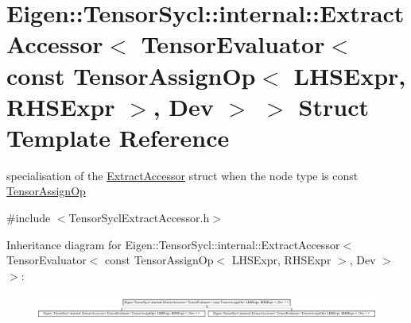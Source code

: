 \hypertarget{struct_eigen_1_1_tensor_sycl_1_1internal_1_1_extract_accessor_3_01_tensor_evaluator_3_01const_0166c12df3446bbeaad23ee09bbae83a69}{}\section{Eigen\+:\+:Tensor\+Sycl\+:\+:internal\+:\+:Extract\+Accessor$<$ Tensor\+Evaluator$<$ const Tensor\+Assign\+Op$<$ L\+H\+S\+Expr, R\+H\+S\+Expr $>$, Dev $>$ $>$ Struct Template Reference}
\label{struct_eigen_1_1_tensor_sycl_1_1internal_1_1_extract_accessor_3_01_tensor_evaluator_3_01const_0166c12df3446bbeaad23ee09bbae83a69}


specialisation of the \hyperlink{struct_eigen_1_1_tensor_sycl_1_1internal_1_1_extract_accessor}{Extract\+Accessor} struct when the node type is const \hyperlink{class_eigen_1_1_tensor_assign_op}{Tensor\+Assign\+Op}  




{\ttfamily \#include $<$Tensor\+Sycl\+Extract\+Accessor.\+h$>$}

Inheritance diagram for Eigen\+:\+:Tensor\+Sycl\+:\+:internal\+:\+:Extract\+Accessor$<$ Tensor\+Evaluator$<$ const Tensor\+Assign\+Op$<$ L\+H\+S\+Expr, R\+H\+S\+Expr $>$, Dev $>$ $>$\+:\begin{figure}[H]
\begin{center}
\leavevmode
\includegraphics[height=0.794326cm]{struct_eigen_1_1_tensor_sycl_1_1internal_1_1_extract_accessor_3_01_tensor_evaluator_3_01const_0166c12df3446bbeaad23ee09bbae83a69}
\end{center}
\end{figure}
